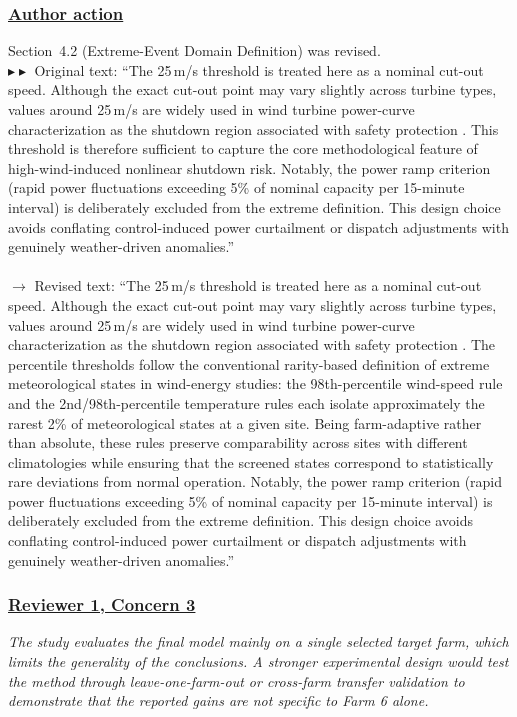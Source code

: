 \documentclass[journal,12pn, onecolumn]{IEEEtran}
\begin{document}
{{{{{{{\subsubsection*{\textbf{\underline{Author action}}}
Section~4.2 (Extreme-Event Domain Definition) was revised.\\
$\blacktriangleright\blacktriangleright$ Original text: ``The 25\,m/s threshold is treated here as a nominal cut-out speed. Although the exact cut-out point may vary slightly across turbine types, values around 25\,m/s are widely used in wind turbine power-curve characterization as the shutdown region associated with safety protection \citep{rabanal2019midas}. This threshold is therefore sufficient to capture the core methodological feature of high-wind-induced nonlinear shutdown risk. Notably, the power ramp criterion (rapid power fluctuations exceeding 5\% of nominal capacity per 15-minute interval) is deliberately excluded from the extreme definition. This design choice avoids conflating control-induced power curtailment or dispatch adjustments with genuinely weather-driven anomalies.''\\\\
$\longrightarrow$ Revised text: ``The 25\,m/s threshold is treated here as a nominal cut-out speed. Although the exact cut-out point may vary slightly across turbine types, values around 25\,m/s are widely used in wind turbine power-curve characterization as the shutdown region associated with safety protection \citep{rabanal2019midas}. {\color{blue}The percentile thresholds follow the conventional rarity-based definition of extreme meteorological states in wind-energy studies: the 98th-percentile wind-speed rule and the 2nd/98th-percentile temperature rules each isolate approximately the rarest 2\% of meteorological states at a given site. Being farm-adaptive rather than absolute, these rules preserve comparability across sites with different climatologies while ensuring that the screened states correspond to statistically rare deviations from normal operation.} Notably, the power ramp criterion (rapid power fluctuations exceeding 5\% of nominal capacity per 15-minute interval) is deliberately excluded from the extreme definition. This design choice avoids conflating control-induced power curtailment or dispatch adjustments with genuinely weather-driven anomalies.''
\textcolor{customgreen}{
\subsubsection*{\underline{\textbf{Reviewer 1, Concern 3}}}
\emph{The study evaluates the final model mainly on a single selected target farm, which limits the generality of the conclusions. A stronger experimental design would test the method through leave-one-farm-out or cross-farm transfer validation to demonstrate that the reported gains are not specific to Farm 6 alone.}
}\\

}}}}}}}
\end{document}
